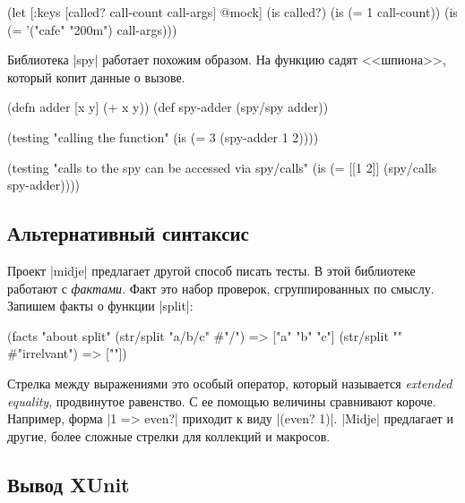 \begin{english}
  \begin{clojure}
(let [{:keys [called? call-count call-args]} @mock]
  (is called?)
  (is (= 1 call-count))
  (is (= '("cafe" "200m") call-args)))
  \end{clojure}
\end{english}

Библиотека \spverb|spy|
работает похожим образом. На функцию садят <<шпиона>>, который копит данные о
вызове.

\begin{english}
  \begin{clojure}
(defn adder [x y] (+ x y))
(def spy-adder (spy/spy adder))

(testing "calling the function"
  (is (= 3 (spy-adder 1 2))))

(testing "calls to the spy can be accessed via spy/calls"
  (is (= [[1 2]] (spy/calls spy-adder))))
  \end{clojure}
\end{english}

\subsection{Альтернативный синтаксис}

Проект \spverb|midje| предлагает другой
способ писать тесты. В этой библиотеке работают с \emph{фактами}. Факт это набор
проверок, сгруппированных по смыслу. Запишем факты о функции \spverb|split|:

\begin{english}
  \begin{clojure}
(facts "about split"
 (str/split "a/b/c" #"/") => ["a" "b" "c"]
 (str/split "" #"irrelvant") => [""])
  \end{clojure}
\end{english}

Стрелка между выражениями это особый оператор, который называется \emph{extended
  equality}, продвинутое равенство. С ее помощью величины сравнивают
короче. Например, форма \spverb|1 => even?| приходит к виду \spverb|(even? 1)|.
\spverb|Midje| предлагает и другие, более сложные стрелки для коллекций и
макросов.

\subsection{Вывод XUnit}

